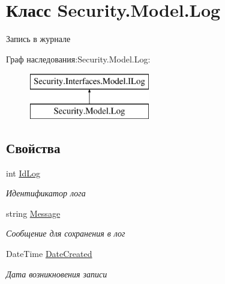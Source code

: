 \hypertarget{class_security_1_1_model_1_1_log}{}\section{Класс Security.\+Model.\+Log}
\label{class_security_1_1_model_1_1_log}


Запись в журнале  


Граф наследования\+:Security.\+Model.\+Log\+:\begin{figure}[H]
\begin{center}
\leavevmode
\includegraphics[height=2.000000cm]{df/db0/class_security_1_1_model_1_1_log}
\end{center}
\end{figure}
\subsection*{Свойства}
\begin{DoxyCompactItemize}
\item 
int \hyperlink{class_security_1_1_model_1_1_log_ab52918840988951379ec3a8c0a1625b4}{Id\+Log}
\begin{DoxyCompactList}\small\item\em Идентификатор лога \end{DoxyCompactList}\item 
string \hyperlink{class_security_1_1_model_1_1_log_afecd7f5b106a5efb4fd36505eaafecbb}{Message}
\begin{DoxyCompactList}\small\item\em Сообщение для сохранения в лог \end{DoxyCompactList}\item 
Date\+Time \hyperlink{class_security_1_1_model_1_1_log_a7f2e52698b1c064b08bf3ac008e76891}{Date\+Created}
\begin{DoxyCompactList}\small\item\em Дата возникновения записи \end{DoxyCompactList}\end{DoxyCompactItemize}


